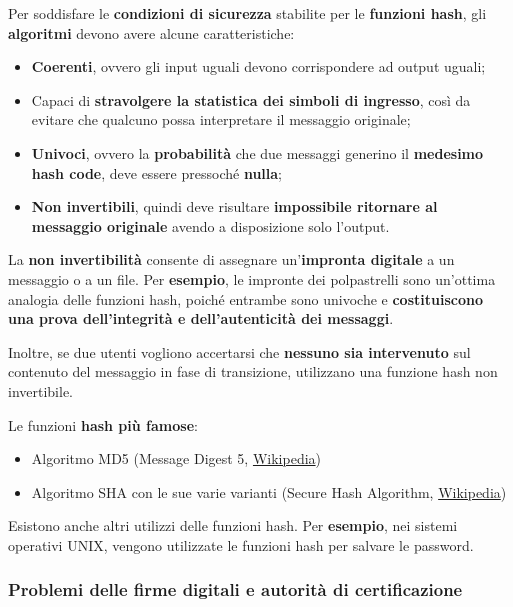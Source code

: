 \documentclass[a4paper]{article}
\begin{document}
	Per soddisfare le \textbf{condizioni di sicurezza} stabilite per le \textbf{funzioni hash}, gli \textbf{algoritmi} devono avere alcune caratteristiche:
	\begin{itemize}
		\item \textcolor{Red3}{\textbf{Coerenti}}, ovvero gli input uguali devono corrispondere ad output uguali;
		
		\item Capaci di \textcolor{Red3}{\textbf{stravolgere la statistica dei simboli di ingresso}}, così da evitare che qualcuno possa interpretare il messaggio originale;
		
		\item \textcolor{Red3}{\textbf{Univoci}}, ovvero la \textbf{probabilità} che due messaggi generino il \textbf{medesimo hash code}, deve essere pressoché \textbf{nulla};
		
		\item \textcolor{Red3}{\textbf{Non invertibili}}, quindi deve risultare \textbf{impossibile ritornare al messaggio originale} avendo a disposizione solo l'output.
	\end{itemize}
	La \textbf{non invertibilità} consente di assegnare un'\textbf{impronta digitale} a un messaggio o a un file. Per \textcolor{Green4}{\textbf{esempio}}, le impronte dei polpastrelli sono un'ottima analogia delle funzioni hash, poiché entrambe sono univoche e \textbf{costituiscono una prova dell'integrità e dell'autenticità dei messaggi}.
	
	Inoltre, se due utenti vogliono accertarsi che \textbf{nessuno sia intervenuto} sul contenuto del messaggio in fase di transizione, utilizzano una funzione hash non invertibile.\newline
	
	\noindent
	Le funzioni \textbf{hash più famose}:
	\begin{itemize}
		\item Algoritmo MD5 (Message Digest 5, \href{https://en.wikipedia.org/wiki/MD5}{Wikipedia})
		
		\item Algoritmo SHA con le sue varie varianti (Secure Hash Algorithm, \href{https://en.wikipedia.org/wiki/Secure_Hash_Algorithms}{Wikipedia})
	\end{itemize}
	Esistono anche altri utilizzi delle funzioni hash. Per \textcolor{Green4}{\textbf{esempio}}, nei sistemi operativi UNIX, vengono utilizzate le funzioni hash per salvare le password.\newpage
	
	\subsubsection{Problemi delle firme digitali e autorità di certificazione}
	
\end{document}
